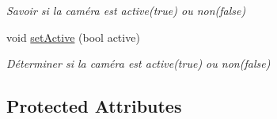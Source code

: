 \begin{DoxyCompactItemize}
\begin{DoxyCompactList}\small\item\em Savoir si la caméra est active(true) ou non(false) \end{DoxyCompactList}\item 
\hypertarget{classAbstractCamera_a0c7bbb7102072e5776646cb8ef04603f}{void \hyperlink{classAbstractCamera_a0c7bbb7102072e5776646cb8ef04603f}{set\+Active} (bool active)}\label{classAbstractCamera_a0c7bbb7102072e5776646cb8ef04603f}

\begin{DoxyCompactList}\small\item\em Déterminer si la caméra est active(true) ou non(false) \end{DoxyCompactList}\end{DoxyCompactItemize}
\subsection*{Protected Attributes}
